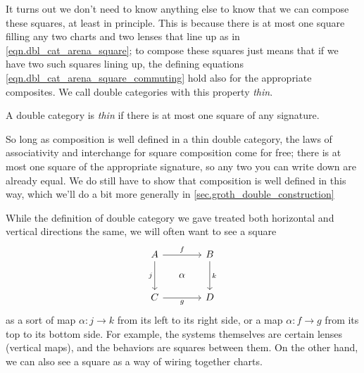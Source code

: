\documentclass[DynamicalBook]{subfiles}
\begin{document}
It turns out we don't need to know anything else to know that we can compose
these squares, at least in principle. This is because there is at most one
square filling any two charts and two lenses that line up as in
\cref{eqn.dbl_cat_arena_square}; to compose these squares just means that if we
have two such squares lining up, the defining equations
\cref{eqn.dbl_cat_arena_square_commuting} hold also for the appropriate
composites. We call double categories with this property \emph{thin}.

\begin{definition}\label{def.thin_double_cat}
  A double category is \emph{thin} if there is at most one square of any
  signature.
\end{definition}

So long as composition is well defined in a thin double category, the laws of
associativity and interchange for square composition come for free; there is at
most one square of the appropriate signature, so any two you can write down are
already equal. We do still have to show that composition is well defined in this
way, which we'll do a bit more generally in \cref{sec.groth_double_construction}

\begin{remark}\label{rmk.double_category_direction}
While the definition of double category we gave treated both horizontal and
vertical directions the same, we will often want to see a square
\[
  \begin{tikzcd}[sep=small]
    A \ar[dd, "j"'] \ar[rr, "f"] & & B \ar[dd, "k"] \\
    & \alpha & \\
    C \ar[rr, "g"'] & & D
  \end{tikzcd}
\]
as a sort of map $\alpha : j \to k$ from its left to its right side, or a map
$\alpha : f \to g$ from its top to its bottom side. For example, the systems
themselves are certain lenses (vertical maps), and the behaviors are squares
between them. On the other hand, we can also see a square as a way of wiring
together charts. 
\end{remark}
\end{document}
